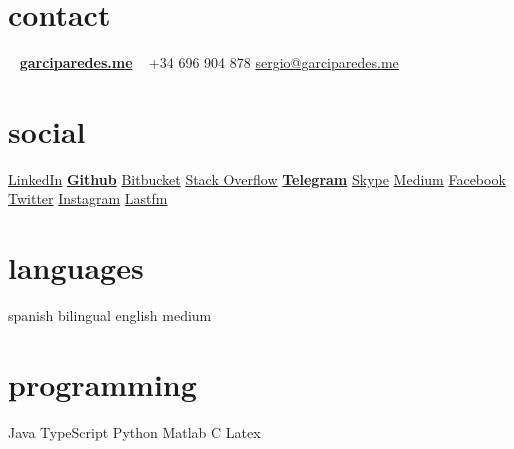 \documentclass[]{friggeri-cv} %
\begin{document}


    \begin{aside} %

        \section{contact}
            ~
            \href{http://garciparedes.me}{\textbf{garciparedes.me}}
            ~
            +34 696 904 878
            \href{mailto:sergio@garciparedes.me}{sergio@garciparedes.me}
        \section{social}
            \href{https://es.linkedin.com/in/garciparedes/en}{LinkedIn\quad\faLinkedin }
            \href{https://github.com/garciparedes}{\textbf{Github}\quad\faGithub }
            \href{https://bitbucket.org/garciparedes/}{Bitbucket\quad\faBitbucket }
            \href{http://stackoverflow.com/users/3921457/garciparedes}{Stack Overflow\quad\faStackOverflow }
            \href{https://telegram.me/garciparedes}{\textbf{Telegram}\quad\faPaperPlane }
            \href{skype:garciparedes?call}{Skype\quad\faSkype }
            \href{https://medium.com/@garciparedes}{Medium\quad\faMedium }
            \href{https://facebook.com/garciparedes}{Facebook\quad\faFacebook}
            \href{https://twitter.com/garciparedes}{Twitter\quad\faTwitter }
            \href{https://www.instagram.com/garciparedes/}{Instagram\quad\faInstagram }
            \href{http://www.last.fm/user/garciparedes/}{Lastfm\quad\faLastfm}
        \section{languages}
            spanish bilingual
            english medium
        \section{programming}
            Java\quad{\color{red} $\varheartsuit\varheartsuit\varheartsuit\varheartsuit\varheartsuit\varheartsuit$}{\color{black} $ $}
            TypeScript\quad{\color{red} $\varheartsuit\varheartsuit\varheartsuit\varheartsuit\varheartsuit$}{\color{black} $\varheartsuit$}
            Python\quad{\color{red} $\varheartsuit\varheartsuit\varheartsuit$}{\color{black} $\varheartsuit\varheartsuit\varheartsuit$}
            Matlab\quad{\color{red} $\varheartsuit\varheartsuit\varheartsuit$}{\color{black} $\varheartsuit\varheartsuit\varheartsuit$}
            C\quad{\color{red} $\varheartsuit\varheartsuit$}{\color{black} $\varheartsuit\varheartsuit\varheartsuit\varheartsuit$}
            Latex\quad{\color{red} $\varheartsuit\varheartsuit\varheartsuit\varheartsuit$}{\color{black} $\varheartsuit\varheartsuit$}

\end{aside}
\end{document}
